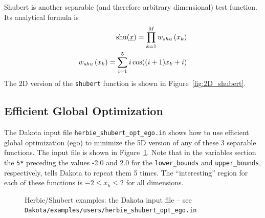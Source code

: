 Shubert is another separable (and therefore arbitrary dimensional) 
test function. Its analytical formula is
\begin{eqnarray*}
{\rm shu}(\underline{x})= \prod_{k=1}^M w_{shu}\left(x_k\right) \\
w_{shu}\left(x_k\right)= \sum_{i=1}^5 i\cos((i+1)x_k+i)
\end{eqnarray*}
The 2D version of the \texttt{shubert} function is shown in 
Figure~\ref{fig:2D_shubert}. 

\subsection{Efficient Global Optimization}

The Dakota input file \texttt{herbie\_shubert\_opt\_ego.in} shows how
to use efficient global optimization (ego) to minimize the 5D version
of any of these 3 separable functions. The input file is shown in 
Figure~\ref{additional:herbie_shubert_ego}. Note that in the variables
section the \texttt{5*} preceding the values -2.0 and 2.0 for the
\texttt{lower\_bounds} and \texttt{upper\_bounds}, respectively, tells
Dakota to repeat them 5 times. The ``interesting'' region for each 
of these functions is $-2\le x_k \le 2$ for all dimensions.

\begin{figure}[ht!]
  \centering
  \begin{small}
    \begin{bigbox}
    \end{bigbox}
  \end{small}
  \caption{Herbie/Shubert examples: the Dakota input file --
see \texttt{Dakota/examples/users/herbie\_shubert\_opt\_ego.in} }
  \label{additional:herbie_shubert_ego}
\end{figure}

